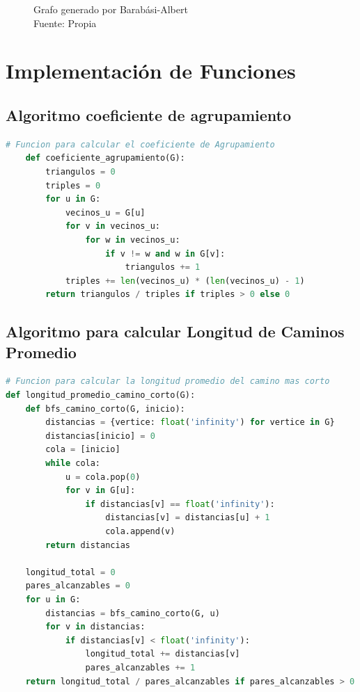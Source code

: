 \documentclass[12pt]{book}
\begin{document}
\begin{figure}[h]
\caption{Grafo generado por Barabási-Albert\\Fuente: Propia}
\end{figure}

\section{Implementación de Funciones}

\subsection{Algoritmo coeficiente de agrupamiento}
\begin{lstlisting}[language=Python]
    # Funcion para calcular el coeficiente de Agrupamiento
    def coeficiente_agrupamiento(G):
        triangulos = 0
        triples = 0
        for u in G:
            vecinos_u = G[u]
            for v in vecinos_u:
                for w in vecinos_u:
                    if v != w and w in G[v]:
                        triangulos += 1
            triples += len(vecinos_u) * (len(vecinos_u) - 1)
        return triangulos / triples if triples > 0 else 0
\end{lstlisting}

\subsection{Algoritmo para calcular Longitud de Caminos Promedio}

\begin{lstlisting}[language=Python]
# Funcion para calcular la longitud promedio del camino mas corto
def longitud_promedio_camino_corto(G):
    def bfs_camino_corto(G, inicio):
        distancias = {vertice: float('infinity') for vertice in G}
        distancias[inicio] = 0
        cola = [inicio]
        while cola:
            u = cola.pop(0)
            for v in G[u]:
                if distancias[v] == float('infinity'):
                    distancias[v] = distancias[u] + 1
                    cola.append(v)
        return distancias

    longitud_total = 0
    pares_alcanzables = 0
    for u in G:
        distancias = bfs_camino_corto(G, u)
        for v in distancias:
            if distancias[v] < float('infinity'):
                longitud_total += distancias[v]
                pares_alcanzables += 1
    return longitud_total / pares_alcanzables if pares_alcanzables > 0 else float('infinity')
\end{lstlisting}
\end{document}
